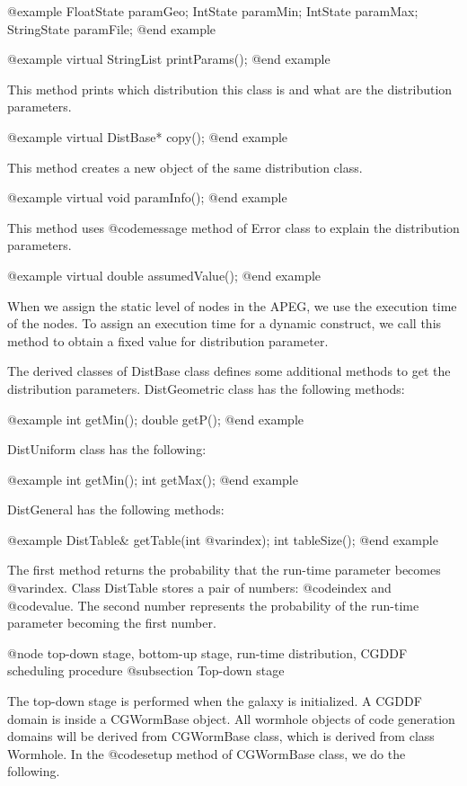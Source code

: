 {@example
FloatState paramGeo;
IntState paramMin;
IntState paramMax;
StringState paramFile;
@end example

@example
virtual StringList printParams();
@end example

This method prints which distribution this class is and what are the
distribution parameters.

@example
virtual DistBase* copy();
@end example

This method creates a new object of the same distribution class.

@example
virtual void paramInfo();
@end example

This method uses @code{message} method of Error class to explain
the distribution parameters.

@example
virtual double assumedValue();
@end example

When we assign the static level of nodes in the APEG, we use the
execution time of the nodes. To assign an execution time for
a dynamic construct, we call this method to obtain a fixed
value for distribution parameter.

The derived classes of DistBase class defines some additional
methods to get the distribution parameters. DistGeometric class
has the following methods:

@example
int getMin();
double getP();
@end example

DistUniform class has the following:

@example
int getMin();
int getMax();
@end example

DistGeneral has the following methods:

@example
DistTable& getTable(int @var{index});
int tableSize();
@end example

The first method returns the probability that the run-time parameter
becomes @var{index}. Class DistTable stores a pair of numbers:
@code{index} and @code{value}. The second number represents the
probability of the run-time parameter becoming the first number.

@node top-down stage, bottom-up stage, run-time distribution, CGDDF scheduling procedure
@subsection Top-down stage

The top-down stage is performed when the galaxy is initialized.
A CGDDF domain is inside a CGWormBase object. All wormhole objects of
code generation domains will be derived from CGWormBase class, which
is derived from class Wormhole. In the @code{setup} method of
CGWormBase class, we do the following.

}
